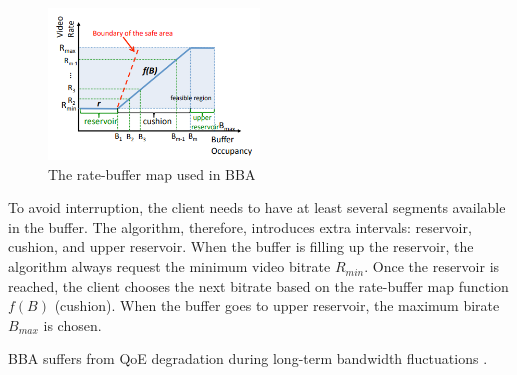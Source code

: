 \documentclass[journal]{IEEEtran}
\begin{document}
\begin{figure}[!h]
	\centering
	
	\includegraphics[width=0.5\textwidth]{images/BBA.PNG}
	
	
	
	\caption{The rate-buffer map used in BBA}
	\label {BBA}
	
\end{figure} 
\par To avoid interruption, the client needs to have at least several
segments available in the buffer. The algorithm, therefore, introduces extra intervals: reservoir, cushion, and upper reservoir. When the buffer is filling up the reservoir, the algorithm always request the minimum video bitrate $R_{min}$. Once the reservoir is reached, the client chooses the next bitrate based on the rate-buffer map function $f(B)$ (cushion). When the buffer goes to upper reservoir, the maximum birate $B_{max}$ is chosen.
\par BBA suffers from QoE degradation during
long-term bandwidth fluctuations \cite{ABR cats}.
\end{document}

